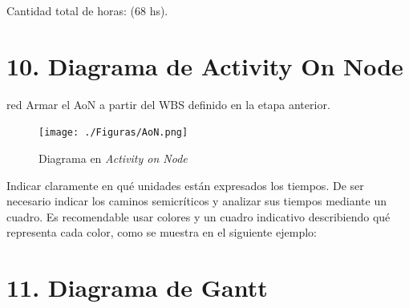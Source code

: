\documentclass[
11pt, %
]{charter}
\begin{document}
Cantidad total de horas: (68 hs).

\section{10. Diagrama de Activity On Node}
\label{sec:AoN}

\begin{consigna}{red}
Armar el AoN a partir del WBS definido en la etapa anterior. 



\end{consigna}

\begin{figure}[htpb]
\centering 
\texttt{[image: ./Figuras/AoN.png]}
\caption{Diagrama en \textit{Activity on Node}}
\label{fig:AoN}
\end{figure}

Indicar claramente en qué unidades están expresados los tiempos.
De ser necesario indicar los caminos semicríticos y analizar sus tiempos mediante un cuadro.
Es recomendable usar colores y un cuadro indicativo describiendo qué representa cada color, como se muestra en el siguiente ejemplo:



\section{11. Diagrama de Gantt}
\label{sec:gantt}
\end{document}
